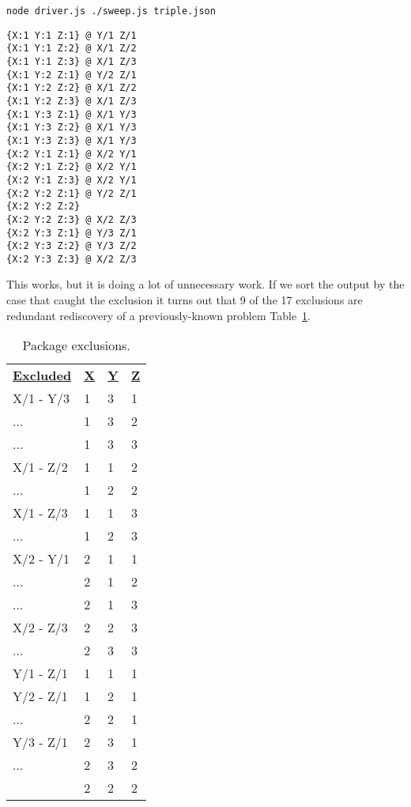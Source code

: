 \documentclass[krantzl]{krantz}
\newcommand{\tblref}[1]{Table~\ref{#1}}
\begin{document}
\begin{lstlisting}[frame=single,frameround=tttt]
node driver.js ./sweep.js triple.json
\end{lstlisting}



\begin{lstlisting}[frame=single,frameround=tttt]
{X:1 Y:1 Z:1} @ Y/1 Z/1
{X:1 Y:1 Z:2} @ X/1 Z/2
{X:1 Y:1 Z:3} @ X/1 Z/3
{X:1 Y:2 Z:1} @ Y/2 Z/1
{X:1 Y:2 Z:2} @ X/1 Z/2
{X:1 Y:2 Z:3} @ X/1 Z/3
{X:1 Y:3 Z:1} @ X/1 Y/3
{X:1 Y:3 Z:2} @ X/1 Y/3
{X:1 Y:3 Z:3} @ X/1 Y/3
{X:2 Y:1 Z:1} @ X/2 Y/1
{X:2 Y:1 Z:2} @ X/2 Y/1
{X:2 Y:1 Z:3} @ X/2 Y/1
{X:2 Y:2 Z:1} @ Y/2 Z/1
{X:2 Y:2 Z:2}
{X:2 Y:2 Z:3} @ X/2 Z/3
{X:2 Y:3 Z:1} @ Y/3 Z/1
{X:2 Y:3 Z:2} @ Y/3 Z/2
{X:2 Y:3 Z:3} @ X/2 Z/3
\end{lstlisting}



This works,
but it is doing a lot of unnecessary work.
If we sort the output by the case that caught the exclusion
it turns out that 9 of the 17 exclusions are redundant rediscovery of a previously-known problem
\tblref{package-manager-exclusions}.

\begin{table}
\begin{tabular}{llll}
\textbf{\underline{Excluded}} & \textbf{\underline{X}} & \textbf{\underline{Y}} & \textbf{\underline{Z}} \\
X/1 - Y/3 & 1 & 3 & 1 \\
... & 1 & 3 & 2 \\
... & 1 & 3 & 3 \\
X/1 - Z/2 & 1 & 1 & 2 \\
... & 1 & 2 & 2 \\
X/1 - Z/3 & 1 & 1 & 3 \\
... & 1 & 2 & 3 \\
X/2 - Y/1 & 2 & 1 & 1 \\
... & 2 & 1 & 2 \\
... & 2 & 1 & 3 \\
X/2 - Z/3 & 2 & 2 & 3 \\
... & 2 & 3 & 3 \\
Y/1 - Z/1 & 1 & 1 & 1 \\
Y/2 - Z/1 & 1 & 2 & 1 \\
... & 2 & 2 & 1 \\
Y/3 - Z/1 & 2 & 3 & 1 \\
... & 2 & 3 & 2 \\
 & 2 & 2 & 2 \\
\end{tabular}
\caption{Package exclusions.}
\label{package-manager-exclusions}
\end{table}
\end{document}
